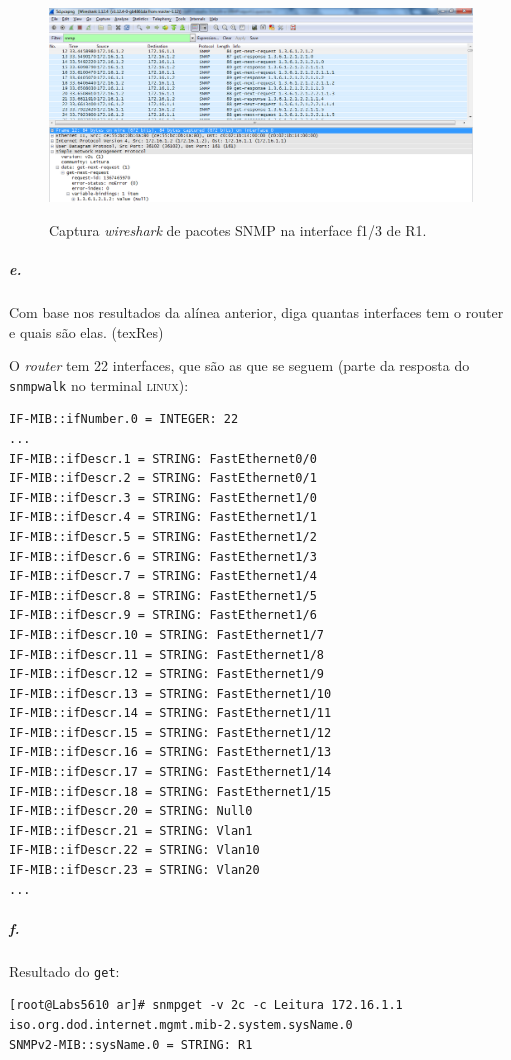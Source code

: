 \begin{figure}[h]
\centering
\includegraphics[width=1\textwidth, height=0.33\textheight]{5d.png}
\label{fig:7-capturaWireshark}
\caption{Captura \emph{wireshark} de pacotes SNMP na interface \textsf{f1/3} de \textsf{R1}.}
\end{figure}


\subparagraph{e.}
Com base nos resultados da alínea anterior, diga quantas interfaces tem o router e quais são elas. (texRes)

O \emph{router} tem 22 interfaces, que são as que se seguem (parte da resposta do \texttt{snmpwalk} no terminal \textsc{linux}):

\begin{verbatim}
IF-MIB::ifNumber.0 = INTEGER: 22
...
IF-MIB::ifDescr.1 = STRING: FastEthernet0/0
IF-MIB::ifDescr.2 = STRING: FastEthernet0/1
IF-MIB::ifDescr.3 = STRING: FastEthernet1/0
IF-MIB::ifDescr.4 = STRING: FastEthernet1/1
IF-MIB::ifDescr.5 = STRING: FastEthernet1/2
IF-MIB::ifDescr.6 = STRING: FastEthernet1/3
IF-MIB::ifDescr.7 = STRING: FastEthernet1/4
IF-MIB::ifDescr.8 = STRING: FastEthernet1/5
IF-MIB::ifDescr.9 = STRING: FastEthernet1/6
IF-MIB::ifDescr.10 = STRING: FastEthernet1/7
IF-MIB::ifDescr.11 = STRING: FastEthernet1/8
IF-MIB::ifDescr.12 = STRING: FastEthernet1/9
IF-MIB::ifDescr.13 = STRING: FastEthernet1/10
IF-MIB::ifDescr.14 = STRING: FastEthernet1/11
IF-MIB::ifDescr.15 = STRING: FastEthernet1/12
IF-MIB::ifDescr.16 = STRING: FastEthernet1/13
IF-MIB::ifDescr.17 = STRING: FastEthernet1/14
IF-MIB::ifDescr.18 = STRING: FastEthernet1/15
IF-MIB::ifDescr.20 = STRING: Null0
IF-MIB::ifDescr.21 = STRING: Vlan1
IF-MIB::ifDescr.22 = STRING: Vlan10
IF-MIB::ifDescr.23 = STRING: Vlan20
...
\end{verbatim}


\subparagraph{f.}
Resultado do \texttt{get}:
\begin{verbatim}
[root@Labs5610 ar]# snmpget -v 2c -c Leitura 172.16.1.1 iso.org.dod.internet.mgmt.mib-2.system.sysName.0
SNMPv2-MIB::sysName.0 = STRING: R1
\end{verbatim}

